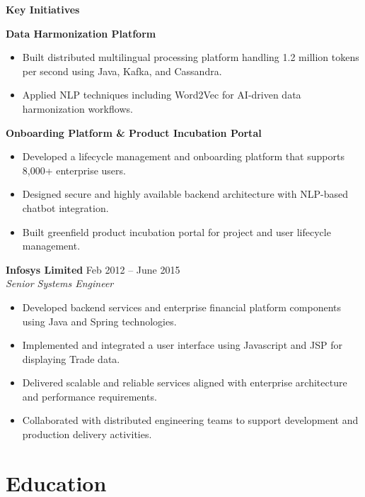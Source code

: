 \documentclass[11pt,a4paper]{article}
\begin{document}
\textbf{Key Initiatives}

\textbf{Data Harmonization Platform}
\begin{itemize}
    \item Built distributed multilingual processing platform handling 1.2 million tokens per second using Java, Kafka, and Cassandra.
    
    \item Applied NLP techniques including Word2Vec for AI-driven data harmonization workflows.
\end{itemize}

\textbf{Onboarding Platform \& Product Incubation Portal}
\begin{itemize}
    \item Developed a lifecycle management and onboarding platform that supports 8,000+ enterprise users.
    
    \item Designed secure and highly available backend architecture with NLP-based chatbot integration.
    
    \item Built greenfield product incubation portal for project and user lifecycle management.
\end{itemize}

\vspace{4pt}

\textbf{Infosys Limited} \hfill Feb 2012 -- June 2015 \\
\textit{Senior Systems Engineer}

\begin{itemize}
    \item Developed backend services and enterprise financial platform components using Java and Spring technologies.
    \item Implemented and integrated a user interface using Javascript and JSP for displaying Trade data.
    \item Delivered scalable and reliable services aligned with enterprise architecture and performance requirements.
    
    \item Collaborated with distributed engineering teams to support development and production delivery activities.
\end{itemize}

\section*{Education}
\end{document}
